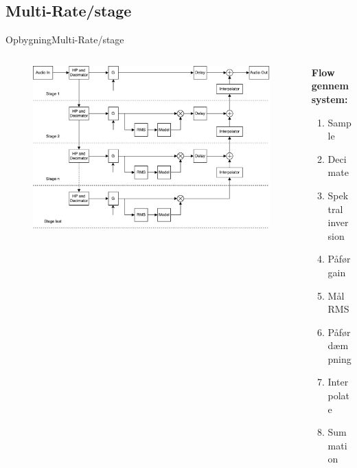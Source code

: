 \subsection{Multi-Rate/stage}
\begin{frame}{Opbygning}{Multi-Rate/stage}
\begin{columns}
  \begin{column}{0.75\textwidth}
\begin{figure}
\includegraphics[width=\textwidth]{designRealBlock1}
\end{figure}
  \end{column}

  \begin{column}{0.25\textwidth}
  \textbf{Flow gennem system:}
     \begin{enumerate}
        \item Sample
        \item Decimate
        \item Spektral inversion
        \item Påfør gain
        \item Mål RMS
        \item Påfør dæmpning
        \item Interpolate
        \item Summation
     \end{enumerate}
  \end{column}
\end{columns}
\end{frame}




